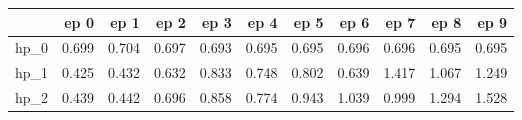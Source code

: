 \begin{tabular}{lrrrrrrrrrr}
\toprule
{} &   ep 0 &   ep 1 &   ep 2 &   ep 3 &   ep 4 &   ep 5 &   ep 6 &   ep 7 &   ep 8 &   ep 9 \\
\midrule
hp\_0 &  0.699 &  0.704 &  0.697 &  0.693 &  0.695 &  0.695 &  0.696 &  0.696 &  0.695 &  0.695 \\
hp\_1 &  0.425 &  0.432 &  0.632 &  0.833 &  0.748 &  0.802 &  0.639 &  1.417 &  1.067 &  1.249 \\
hp\_2 &  0.439 &  0.442 &  0.696 &  0.858 &  0.774 &  0.943 &  1.039 &  0.999 &  1.294 &  1.528 \\
\bottomrule
\end{tabular}
